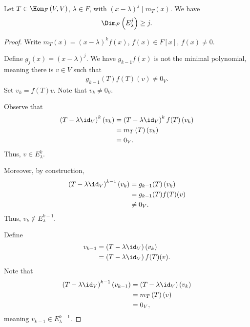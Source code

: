 \documentclass[10pt]{mypackage}
\begin{document}
\begin{theorem}
  Let $T\in \Hom_{F}\left(V,V\right)$, $\lambda \in F$, with $\left(x-\lambda\right)^{j}\mid m_{T}\left(x\right)$. We have
  \begin{align*}
    \Dim_{F}\left(E_{\lambda}^{j}\right) \geq j.
  \end{align*}
\end{theorem}
\begin{proof}
  Write $m_T(x) = \left(x-\lambda\right)^{k}f(x)$, $f(x)\in F[x]$, $f(x)\neq 0$.\newline

  Define $g_j\left(x\right) = \left(x-\lambda\right)^{j}$. We have $g_{k-1}f(x)$ is not the minimal polynomial, meaning there is $v\in V$ such that
  \begin{align*}
    g_{k-1}\left(T\right)f(T)(v) \neq 0_V.
  \end{align*}
  Set $v_k = f(T) v$. Note that $v_k \neq 0_V$.\newline

  Observe that 
  \begin{align*}
    \left(T - \lambda \id_{V}\right)^k\left(v_k\right) &= \left(T-\lambda \id_V\right)^{k}f(T) \left(v_k\right)\\
                                                       &= m_{T}\left(T\right)\left(v_k\right)\\
                                                       &= 0_V.
  \end{align*}
  Thus, $v\in E_{\lambda}^{k}$.\newline

  Moreover, by construction, 
  \begin{align*}
    \left(T-\lambda\id_{V}\right)^{k-1}\left(v_k\right) &= g_{k-1}(T)\left(v_k\right)\\
                                                        &= g_{k-1}(T)f(T)(v)\\
                                                        &\neq 0_{V}.
  \end{align*}
  Thus, $v_k\notin E_{\lambda}^{k-1}$.\newline

  Define
  \begin{align*}
    v_{k-1} &= \left(T - \lambda \id_V\right)\left(v_k\right)\\
            &= \left(T - \lambda \id_V\right)f(T)(v).
  \end{align*}
  Note that
  \begin{align*}
    \left(T - \lambda \id_V\right)^{k-1}\left(v_{k-1}\right) &= \left(T - \lambda\id_V\right)\left(v_k\right)\\
                                                             &= m_T\left(T\right)(v)\\
                                                             &= 0_V,
  \end{align*}
  meaning $v_{k-1}\in E_{\lambda}^{k-1}$.\newline


\end{proof}
\end{document}
